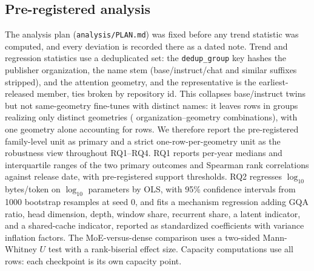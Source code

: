 \subsection{Pre-registered analysis}\label{dm:plan}
The analysis plan (\texttt{analysis/PLAN.md}) was fixed before any trend statistic was
computed, and every deviation is recorded there as a dated note. Trend and regression
statistics use a deduplicated set: the \texttt{dedup\_group} key hashes the publisher
organization, the name stem (base/instruct/chat and similar suffixes stripped), and the
attention geometry, and the representative is the earliest-released member, ties broken
by repository id. This collapses base/instruct twins but not same-geometry fine-tunes
with distinct names: it leaves \kvcDedupRows{} rows in \kvcGroups{} groups realizing
only \kvcGeoRows{} distinct geometries (\kvcOrgGeoRows{} organization--geometry
combinations), with one geometry alone accounting for \kvcWorstGeoCluster{} rows. We
therefore report the pre-registered family-level unit as primary and a strict
one-row-per-geometry unit as the robustness view throughout RQ1--RQ4. RQ1 reports
per-year medians and interquartile ranges of the two primary outcomes and Spearman rank
correlations against release date, with pre-registered support thresholds. RQ2 regresses
$\log_{10}$ bytes/token on $\log_{10}$ parameters by OLS, with 95\% confidence intervals
from 1000 bootstrap resamples at seed 0, and fits a mechanism regression adding GQA ratio,
head dimension, depth, window share, recurrent share, a latent indicator, and a
shared-cache indicator, reported as standardized coefficients with variance inflation
factors. The MoE-versus-dense comparison uses a two-sided Mann-Whitney $U$ test with a
rank-biserial effect size. Capacity computations use all rows: each checkpoint is its own
capacity point.

